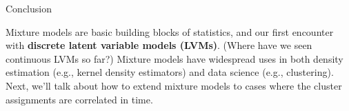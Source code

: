 \documentclass[aspectratio=169]{beamer}
\begin{document}
\begin{frame}[t, allowframebreaks]{Conclusion}\label{conclusion}

Mixture models are basic building blocks of statistics, and our first
encounter with \textbf{discrete latent variable models (LVMs)}. (Where
have we seen continuous LVMs so far?) Mixture models have widespread
uses in both density estimation (e.g., kernel density estimators) and
data science (e.g., clustering). Next, we'll talk about how to extend
mixture models to cases where the cluster assignments are correlated in
time.
\end{frame}

    
    
\end{document}
